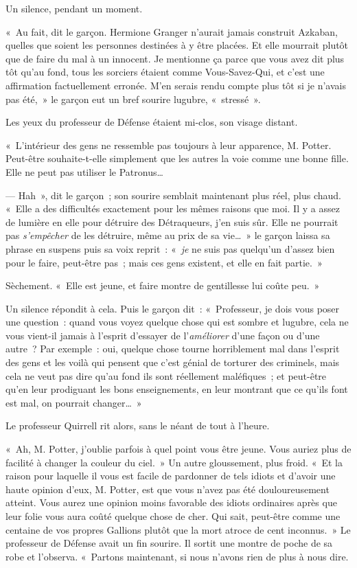 Un silence, pendant un moment.

«~Au fait, dit le garçon.
Hermione Granger n'aurait jamais construit Azkaban, quelles que soient les personnes destinées à y être placées.
Et elle mourrait plutôt que de faire du mal à un innocent.
Je mentionne ça parce que vous avez dit plus tôt qu'au fond, tous les sorciers étaient comme Vous-Savez-Qui, et c'est une affirmation factuellement erronée.
M'en serais rendu compte plus tôt si je n'avais pas été,~» le garçon eut un bref sourire lugubre, «~stressé~».

Les yeux du professeur de Défense étaient mi-clos, son visage distant.

«~L'intérieur des gens ne ressemble pas toujours à leur apparence, M. Potter.
Peut-être souhaite-t-elle simplement que les autres la voie comme une bonne fille.
Elle ne peut pas utiliser le Patronus…

--- Hah~», dit le garçon~; son sourire semblait maintenant plus réel, plus chaud.
«~Elle a des difficultés exactement pour les mêmes raisons que moi.
Il y a assez de lumière en elle pour détruire des Détraqueurs, j'en suis sûr.
Elle ne pourrait pas \emph{s'empêcher} de les détruire, même au prix de sa vie…~»
le garçon laissa sa phrase en suspens puis sa voix reprit~: «~\emph{je} ne suis pas quelqu'un d'assez bien pour le faire, peut-être pas~; mais ces gens existent, et elle en fait partie.~»

Sèchement.
«~Elle est jeune, et faire montre de gentillesse lui coûte peu.~»

Un silence répondit à cela.
Puis le garçon dit~: «~Professeur, je dois vous poser une question~: quand vous voyez quelque chose qui est sombre et lugubre, cela ne vous vient-il jamais à l'esprit d'essayer de l'\emph{améliorer} d'une façon ou d'une autre~?
Par exemple~: oui, quelque chose tourne horriblement mal dans l'esprit des gens et les voilà qui pensent que c'est génial de torturer des criminels, mais cela ne veut pas dire qu'au fond ils sont réellement maléfiques~; et peut-être qu'en leur prodiguant les bons enseignements, en leur montrant que ce qu'ils font est mal, on pourrait changer…~»

Le professeur Quirrell rit alors, sans le néant de tout à l'heure.

«~Ah, M. Potter, j'oublie parfois à quel point vous être jeune.
Vous auriez plus de facilité à changer la couleur du ciel.~»
Un autre gloussement, plus froid.
«~Et la raison pour laquelle il vous est facile de pardonner de tels idiots et d'avoir une haute opinion d'eux, M. Potter, est que vous n'avez pas été douloureusement atteint.
Vous aurez une opinion moins favorable des idiots ordinaires après que leur folie vous aura coûté quelque chose de cher.
Qui sait, peut-être comme une centaine de vos propres Gallions plutôt que la mort atroce de cent inconnus.~»
Le professeur de Défense avait un fin sourire.
Il sortit une montre de poche de sa robe et l'observa.
«~Partons maintenant, si nous n'avons rien de plus à nous dire.

